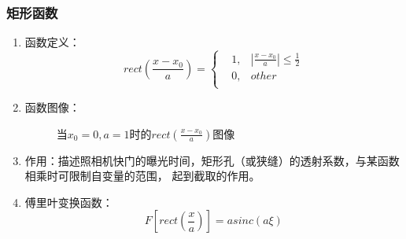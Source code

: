 \documentclass[twocolumn]{ctexart}
\begin{document}
\subsubsection{矩形函数}
\begin{enumerate}
    \item
          函数定义：
          \begin{equation}
              rect\left(\frac{x-x_0}{a}\right)=\left\{
              \begin{aligned}
                   & 1, & \left\lvert \frac{x-x_0}{a} \right\rvert \leqslant \frac{1}{2} \\
                   & 0, & other                                                          \\
              \end{aligned}
              \right.
              \nonumber
          \end{equation}
    \item
          函数图像：
          \begin{figure}[H]
              \caption{当$x_0=0,a=1$时的$rect\left(\frac{x-x_0}{a}\right)$图像}
          \end{figure}
    \item
          作用：描述照相机快门的曝光时间，矩形孔（或狭缝）的透射系数，与某函数相乘时可限制自变量的范围，
          起到截取的作用。
    \item
          傅里叶变换函数：
          \begin{equation}
              F\left[rect\left(\frac{x}{a}\right)\right]=asinc(a\xi)
              \nonumber
          \end{equation}
\end{enumerate}
\end{document}
